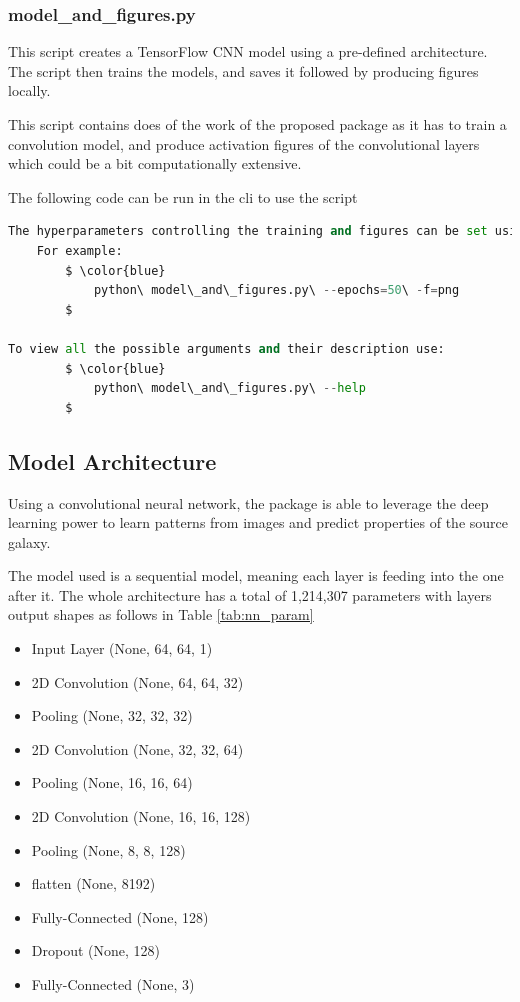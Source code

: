 \documentclass[12pt]{article}
\begin{document}
\subsubsection{model\_and\_figures.py}
This script creates a TensorFlow CNN model using a pre-defined architecture. The script then trains the models, and saves it followed by producing figures locally.

This script contains does of the work of the proposed package as it has to train a convolution model, and produce activation figures of the convolutional layers which could be a bit computationally extensive.

The following code can be run in the cli to use the script

\begin{lstlisting}[mathescape=true, language=python]
The hyperparameters controlling the training and figures can be set using the cli arguments while running the script.
    For example:
        $ \color{blue}
            python\ model\_and\_figures.py\ --epochs=50\ -f=png
        $
        
To view all the possible arguments and their description use:
        $ \color{blue}
            python\ model\_and\_figures.py\ --help
		$
\end{lstlisting}

\subsection{Model Architecture}
Using a convolutional neural network, the package is able to leverage the deep learning power to learn patterns from images and predict properties of the source galaxy.

The model used is a sequential model, meaning each layer is feeding into the one after it. The whole architecture has a total of 1,214,307 parameters with layers output shapes as follows in Table \ref{tab:nn_param}


\begin{itemize}
    \item Input Layer (None, 64, 64, 1)
    \item 2D Convolution (None, 64, 64, 32)
    \item Pooling (None, 32, 32, 32)
    \item 2D Convolution (None, 32, 32, 64)
    \item Pooling (None, 16, 16, 64)
    \item 2D Convolution (None, 16, 16, 128)
    \item Pooling (None, 8, 8, 128)
    \item flatten (None, 8192)
    \item Fully-Connected (None, 128)
    \item Dropout (None, 128)
    \item Fully-Connected (None, 3)
\end{itemize}
\end{document}
